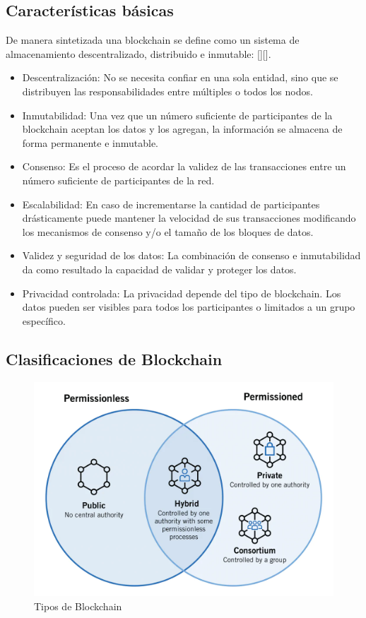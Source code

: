 \subsection{Características básicas}
De manera sintetizada una blockchain se define como un sistema de almacenamiento descentralizado, distribuido e inmutable: [\cite{zheng2017overview}][\cite{makridakis2019blockchain}].
\begin{itemize}
	\item Descentralización: No se necesita confiar en una sola entidad, sino que se distribuyen las responsabilidades entre múltiples o todos los nodos.
	\item Inmutabilidad: Una vez que un número suficiente de participantes de la blockchain aceptan los datos y los agregan, la información se almacena de forma permanente e inmutable.
	\item Consenso: Es el proceso de acordar la validez de las transacciones entre un número suficiente de participantes de la red.
	\item Escalabilidad: En caso de incrementarse la cantidad de participantes drásticamente puede mantener la velocidad de sus transacciones modificando los mecanismos de consenso y/o el tamaño de los bloques de datos.
	\item Validez y seguridad de los datos: La combinación de consenso e inmutabilidad da como resultado la capacidad de validar y proteger los datos.
	\item Privacidad controlada: La privacidad depende del tipo de blockchain. Los datos pueden ser visibles para todos los participantes o limitados a un grupo específico.
\end{itemize}

\subsection{Clasificaciones de Blockchain}

\begin{figure}[h!]
	\centering
	\includegraphics[width=\linewidth]{Graphics/bc_types.png}
	\caption{Tipos de Blockchain}
	\label{fig:1}
\end{figure}

